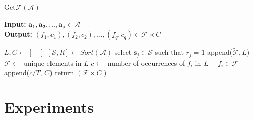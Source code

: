 \documentclass[conference]{IEEEtran}
\newcommand{\p}[1]{{\color{blue} Pdj: #1}}
\begin{document}
\begin{algorithm}
	\caption{ Get$\mathcal{F}$$(\mathcal{A})$ }
	\label{alg:f}
	\hspace*{\algorithmicindent} \textbf{Input: } $ \mathbf{a_1},\mathbf{a_2} ,\dots, \mathbf{a_p}\in \mathcal{A}$ \\
	\hspace*{\algorithmicindent} \textbf{Output: } $ (f_1,c_1), (f_2, c_2), \dots, (f_q,c_q) \in \mathcal{F} \times C  $
	\begin{algorithmic}[1] 
		\State $L, C \leftarrow [ \quad ]$ 
		\State $[\mathcal{S}, R] \leftarrow Sort(\mathcal{A})$ 
		\State select $\mathbf{s}_j \in \mathcal{S}$ such that $r_j = 1$
		\State append($\tilde{\mathcal{F}}, L $)
		\EndFor
		\State $\mathcal{F} \leftarrow $ unique elements in $L$ 
		\State $c \leftarrow$ number of occurrences of $f_i$ in $L$ $\quad f_i \in \mathcal{F}$
		\State append($c/T$, $C$)
		\EndFor
		\State return $(\mathcal{F} \times C)$
              \end{algorithmic}
\end{algorithm}

\section{Experiments}
\label{sec:exp}
\end{document}

